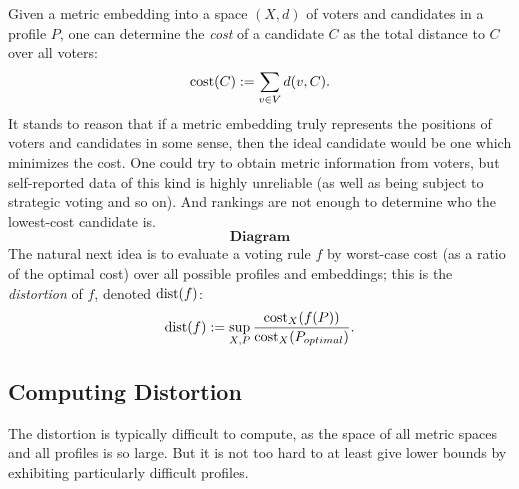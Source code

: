 \documentclass{amsart}
\DeclareMathOperator{\cost}{\rm{cost}}
\DeclareMathOperator{\dist}{\rm{dist}}
\begin{document}
Given a metric embedding into a space $(X,d)$ of voters and candidates in a profile $P$, one can determine the \textit{cost} of a candidate $C$ as the total distance to $C$ over all voters:
$$
\cost(C) := \sum_{v\in V} d(v,C).
$$ 
It stands to reason that if a metric embedding truly represents the positions of voters and candidates in some sense, then the ideal candidate would be one which minimizes the cost. One could try to obtain metric information from voters, but self-reported data of this kind is highly unreliable (as well as being subject to strategic voting and so on). And rankings are not enough to determine who the lowest-cost candidate is. 
$$
\textbf{Diagram}
$$
The natural next idea is to evaluate a voting rule $f$ by worst-case cost (as a ratio of the optimal cost) over all possible profiles and embeddings; this is the \textit{distortion} of $f$, denoted $\dist(f)$:
$$
\dist(f) := \sup_{X,P} \frac{\cost_X(f(P))}{\cost_X(P_{optimal})}.
$$ 

\subsection{Computing Distortion}
The distortion is typically difficult to compute, as the space of all metric spaces and all profiles is so large. But it is not too hard to at least give lower bounds by exhibiting particularly difficult profiles. \\
\end{document}

